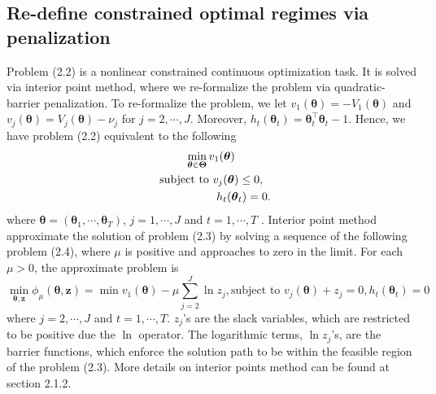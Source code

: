 \documentclass{article}
\newcommand{\itl}{\intercal}
\newcommand{\bs}{ \boldsymbol}
\newcommand{\txt}{\text}
\begin{document}
\subsection{Re-define constrained optimal regimes via penalization}
Problem (2.2) is a nonlinear constrained continuous optimization task. It is solved via interior point method, where we re-formalize  the problem via quadratic-barrier penalization. To re-formalize the problem, we let $v_1(\bs{\theta}) = -V_1(\bs{\theta})$ and $v_j(\bs{\theta}) = V_j(\bs{\theta}) - \nu_j$ for $j = 2, \cdots, J$. Moreover, $h_t(\bs{\theta}_t) = \bs{\theta}_t^{\itl}\bs{\theta}_t - 1$. Hence, we have problem (2.2) equivalent to the following
\begin{equation}
\begin{gathered}
\min_{\bs{\theta} \in \bs{\Theta}} v_1(\bs{\theta})\\
\txt{subject to } v_j(\bs{\theta}) \le 0, \\
\hspace{2.0cm}h_t(\bs{\theta}_t) = 0.
\end{gathered}
\end{equation}
where $\bs{\theta} = (\bs{\theta}_1, \cdots, \bs{\theta}_T)$, $j =1, \cdots, J$ and $t = 1, \cdots, T$ . Interior point method approximate the solution of problem (2.3) by solving a sequence of the following problem (2.4), where $\mu$ is positive and approaches to zero in the limit. For each $\mu > 0$, the approximate problem is 
\begin{equation}
\min_{\bs{\theta}, \bs{z}} \phi_{\mu}(\bs{\theta}, \bs{z}) = \min v_1(\bs{\theta}) - \mu \sum_{j=2}^J \ln z_j, \text{subject to}\,\, v_j(\bs{\theta}) +z_j = 0, h_t(\bs{\theta}_t) = 0
\end{equation}
where $j=2, \cdots, J$ and $t = 1, \cdots, T$. $z_j$'s are the slack variables, which are restricted to be positive due the $\ln$ operator. The logarithmic terms, $\ln z_j$'s, are the barrier functions, which enforce the solution path to be within the feasible region of the problem (2.3). More details on interior points method can be found at section 2.1.2. \\
\end{document}
